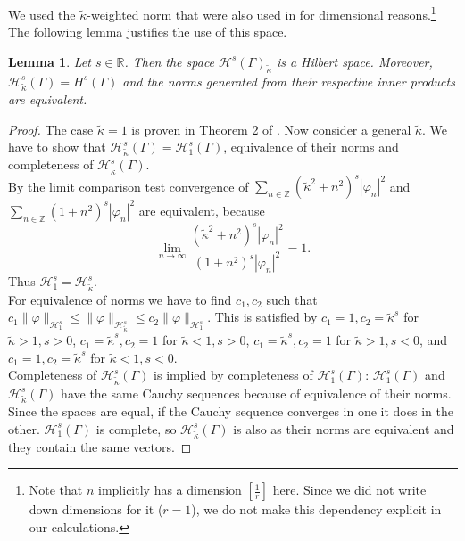 \documentclass[12pt,journal,compsoc, onecolumn]{IEEEtran}
\newtheorem{lemma}[theorem]{Lemma}
\begin{document}
We used the $\tilde \kappa$-weighted norm that were also used in \cite{hiptmair2021spurious} for dimensional reasons.\footnote{Note that $n$ implicitly has a dimension $[\frac{1}{r}]$ here. Since we did not write down dimensions for it ($r = 1$), we do not make this dependency explicit in our calculations.} 
The following lemma justifies the use of this space.
\begin{lemma}
Let \(s \in \mathbb{R}\). Then the space \(\mathcal{H}^{s}(\Gamma)_{\tilde \kappa}\) is a Hilbert space. Moreover, \(\mathcal{H}^{s}_{\tilde \kappa}(\Gamma) = H^{s}(\Gamma)\) and the norms generated from their respective inner products are equivalent. 
\end{lemma}
\begin{proof}
    The case $\tilde \kappa = 1$ is proven in Theorem 2 of \cite{amini1998preconditioned}. Now consider a general $\tilde \kappa$. We have to show that $\mathcal{H}^{s}_{\tilde \kappa}(\Gamma)= \mathcal{H}^{s}_{1}(\Gamma)$, equivalence of their norms and completeness of $\mathcal{H}^{s}_{\tilde \kappa}(\Gamma)$. \\
    By the limit comparison test convergence of $\sum\limits_{n \in \mathbb{Z}}\left(\tilde \kappa^2+n^{2}\right)^{s}\left|\varphi_{n}\right|^{2}$ and $\sum\limits_{n \in \mathbb{Z}}\left(1+n^{2}\right)^{s}\left|\varphi_{n}\right|^{2}$ are equivalent, because $$\lim\limits_{n \rightarrow \infty} \frac{\left(\tilde \kappa^2+n^{2}\right)^{s}\left|\varphi_{n}\right|^{2}}{\left(1+n^{2}\right)^{s}\left|\varphi_{n}\right|^{2}} = 1.$$ Thus $\mathcal{H}^{s}_{1} = \mathcal{H}^{s}_{\tilde \kappa}$. \\
    For equivalence of norms we have to find $c_1, c_2$ such that 
    $c_1 \|\varphi\|_{\mathcal{H}^s_{1}} \leq \|\varphi\|_{\mathcal{H}^s_{\tilde{\kappa}}} \leq c_2 \|\varphi\|_{\mathcal{H}^s_{1}}$. This is satisfied by $c_1 = 1, c_2 = \tilde \kappa^s$ for $\tilde\kappa > 1, s > 0$, $c_1 =\tilde \kappa^s, c_2 = 1$ for $\tilde\kappa < 1, s > 0$,
    $c_1 = \tilde \kappa^s, c_2 = 1$ for $\tilde\kappa > 1, s < 0$,
    and $c_1 =1, c_2 =\tilde \kappa^s$ for $\tilde\kappa < 1, s < 0$. \\
    Completeness of $\mathcal{H}^{s}_{\tilde \kappa}(\Gamma)$ is implied by completeness of $\mathcal{H}^{s}_{1}(\Gamma)$:   $\mathcal{H}^{s}_{1}(\Gamma)$ and $\mathcal{H}^{s}_{\tilde \kappa}(\Gamma)$ have the same Cauchy sequences because of equivalence of their norms. Since the spaces are equal, if the Cauchy sequence converges in one it does in the other. $\mathcal{H}^{s}_{1}(\Gamma)$ is complete, so  $\mathcal{H}^{s}_{\tilde \kappa}(\Gamma)$ is also as their norms are equivalent and they contain the same vectors.
\end{proof}  \noindent
\end{document}
